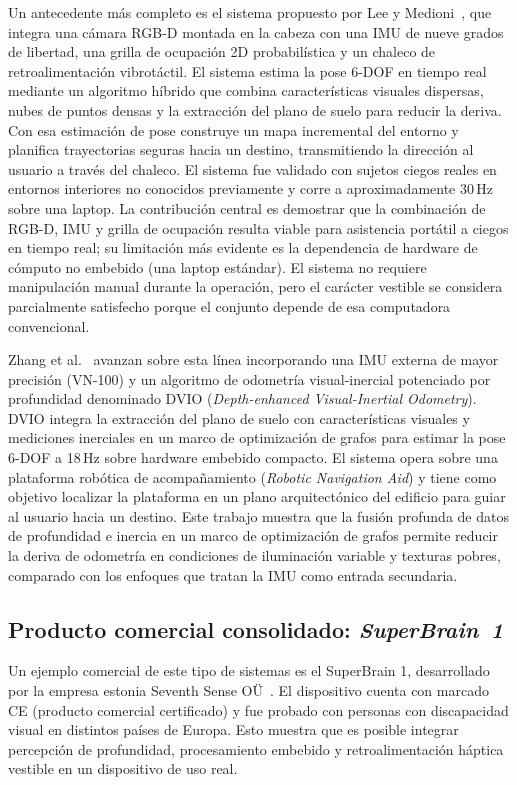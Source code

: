 Un antecedente más completo es el sistema propuesto por Lee y Medioni~\cite{Lee2016RGBD}, que
integra una cámara RGB-D montada en la cabeza con una IMU de nueve grados de libertad, una grilla
de ocupación 2D probabilística y un chaleco de retroalimentación vibrotáctil. El sistema estima la
pose 6-DOF en tiempo real mediante un algoritmo híbrido que combina características visuales
dispersas, nubes de puntos densas y la extracción del plano de suelo para reducir la deriva. Con
esa estimación de pose construye un mapa incremental del entorno y planifica trayectorias seguras
hacia un destino, transmitiendo la dirección al usuario a través del chaleco. El sistema fue
validado con sujetos ciegos reales en entornos interiores no conocidos previamente y corre a
aproximadamente 30\,Hz sobre una laptop. La contribución central es demostrar que la combinación de
RGB-D, IMU y grilla de ocupación resulta viable para asistencia portátil a ciegos en tiempo real;
su limitación más evidente es la dependencia de hardware de cómputo no embebido (una laptop
estándar). El sistema no requiere manipulación manual durante la operación, pero el carácter
vestible se considera parcialmente satisfecho porque el conjunto depende de esa computadora
convencional.

Zhang et al.\ \cite{Zhang2021DVIO} avanzan sobre esta línea incorporando una IMU externa de mayor
precisión (VN-100) y un algoritmo de odometría visual-inercial potenciado por profundidad
denominado DVIO (\emph{Depth-enhanced Visual-Inertial Odometry}). DVIO integra la extracción del
plano de suelo con características visuales y mediciones inerciales en un marco de optimización de
grafos para estimar la pose 6-DOF a 18\,Hz sobre hardware embebido compacto. El sistema opera sobre
una plataforma robótica de acompañamiento (\emph{Robotic Navigation Aid}) y tiene como objetivo
localizar la plataforma en un plano arquitectónico del edificio para guiar al usuario hacia un
destino. Este trabajo muestra que la fusión profunda de datos de profundidad e inercia en un marco
de optimización de grafos permite reducir la deriva de odometría en condiciones de iluminación
variable y texturas pobres, comparado con los enfoques que tratan la IMU como entrada secundaria.

\subsection{Producto comercial consolidado: \emph{SuperBrain~1}}
\label{subsec:ea-superbrain}

Un ejemplo comercial de este tipo de sistemas es el SuperBrain 1, desarrollado por la empresa
estonia Seventh Sense OÜ~\cite{SeventhSense2024SuperBrain}. El dispositivo cuenta con marcado CE
(producto comercial certificado) y fue probado con personas con discapacidad visual en distintos
países de Europa. Esto muestra que es posible integrar percepción de profundidad, procesamiento
embebido y retroalimentación háptica vestible en un dispositivo de uso real.

